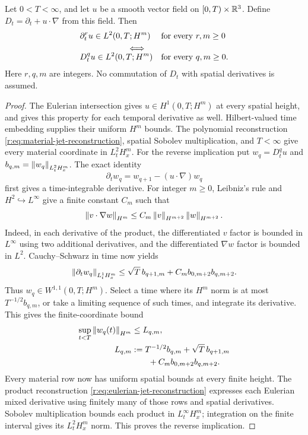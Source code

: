 \begin{proposition}
\label{r:prop:material-intersection}
Let \(0<T<\infty\), and let \(u\) be a smooth vector field on
\([0,T)\times\mathbb R^3\). Define \(D_t=\partial_t+u\cdot\nabla\) from this field.
Then
\begin{equation}
 \begin{aligned}
 &\partial_t^ru\in L^2(0,T;H^m)
       &&\text{for every }r,m\ge0\\
 &\hspace{20mm}\Longleftrightarrow\\[-2mm]
 &D_t^qu\in L^2(0,T;H^m)
       &&\text{for every }q,m\ge0.
 \end{aligned}
 \label{r:eq:intersection-equivalence}
\end{equation}
Here \(r,q,m\) are integers. No commutation of \(D_t\) with spatial
derivatives is assumed.
\end{proposition}
\begin{proof}
The Eulerian intersection gives
\(u\in H^1(0,T;H^m)\) at every spatial height, and gives this
property for each temporal derivative as well. Hilbert-valued time
embedding supplies their uniform \(H^m\) bounds. The polynomial
reconstruction \eqref{r:eq:material-jet-reconstruction}, spatial Sobolev
multiplication, and \(T<\infty\) give every material coordinate in
\(L^2_tH^m_x\).
For the reverse implication put \(w_q=D_t^qu\) and
\(b_{q,m}=\left\lVert w_q\right\rVert_{L^2_tH^m_x}\). The exact identity
\[
 \partial_tw_q=w_{q+1}-(u\cdot\nabla)w_q
\]
first gives a time-integrable derivative. For integer \(m\ge0\),
Leibniz's rule and \(H^2\hookrightarrow L^\infty\) give a finite
constant \(C_m\) such that
\[
 \left\lVert v\cdot\nabla w\right\rVert_{H^m}
 \le C_m\left\lVert v\right\rVert_{H^{m+2}}\left\lVert w\right\rVert_{H^{m+2}}.
\]
Indeed, in each derivative of the product, the differentiated \(v\)
factor is bounded in \(L^\infty\) using two additional derivatives,
and the differentiated \(\nabla w\) factor is bounded in \(L^2\).
Cauchy--Schwarz in time now yields
\[
 \left\lVert \partial_tw_q\right\rVert_{L^1_tH^m_x}
 \le\sqrt T\,b_{q+1,m}+C_m b_{0,m+2}b_{q,m+2}.
\]
Thus \(w_q\in W^{1,1}(0,T;H^m)\). Select a time where its
\(H^m\) norm is at most \(T^{-1/2}b_{q,m}\), or take a limiting
sequence of such times, and integrate its derivative. This gives the
finite-coordinate bound
\begin{equation}
 \begin{aligned}
 \sup_{t<T}\left\lVert w_q(t)\right\rVert_{H^m}
 &\le L_{q,m},\\
 L_{q,m}
 &:=T^{-1/2}b_{q,m}+\sqrt T\,b_{q+1,m}\\
 &\hspace{7mm}+C_m b_{0,m+2}b_{q,m+2}.
 \end{aligned}
 \label{r:eq:material-reverse-trace}
\end{equation}
Every material row now has uniform spatial bounds at every finite
height. The product reconstruction
\eqref{r:eq:eulerian-jet-reconstruction} expresses each Eulerian mixed
derivative using finitely many of those rows and spatial derivatives.
Sobolev multiplication bounds each product in \(L^\infty_tH^m_x\);
integration on the finite interval gives its \(L^2_tH^m_x\) norm.
This proves the reverse implication.
\end{proof}

